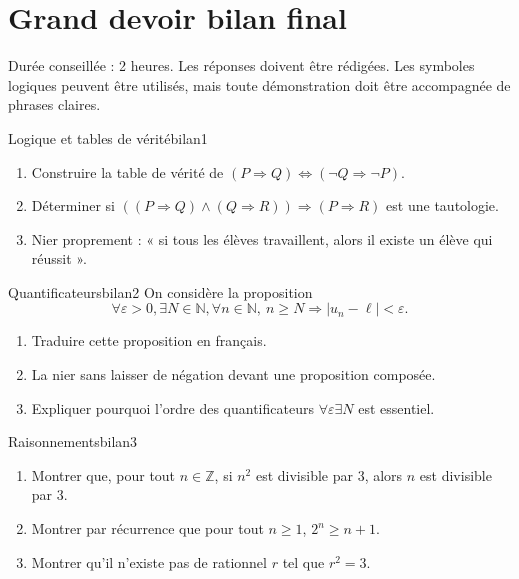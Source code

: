 \documentclass[11pt,a4paper]{article}
\newcommand{\N}{\mathbb{N}}
\newcommand{\Z}{\mathbb{Z}}
\begin{document}
\section{Grand devoir bilan final}

\begin{center}
\begin{tcolorbox}[width=0.95\textwidth,colframe=bleuprepa,colback=blue!3!white,title={Devoir bilan -- Logique, raisonnement, ensembles et applications}]
Durée conseillée : 2 heures. Les réponses doivent être rédigées. Les symboles logiques peuvent être utilisés, mais toute démonstration doit être accompagnée de phrases claires.
\end{tcolorbox}
\end{center}

\begin{exercicebox}{Logique et tables de vérité}{bilan1}
\begin{enumerate}
  \item Construire la table de vérité de $(P\Rightarrow Q)\Longleftrightarrow(\neg Q\Rightarrow\neg P)$.
  \item Déterminer si $((P\Rightarrow Q)\land(Q\Rightarrow R))\Rightarrow(P\Rightarrow R)$ est une tautologie.
  \item Nier proprement : « si tous les élèves travaillent, alors il existe un élève qui réussit ».
\end{enumerate}
\end{exercicebox}

\begin{exercicebox}{Quantificateurs}{bilan2}
On considère la proposition
\[
\forall \varepsilon>0,\exists N\in\N,\forall n\in\N,\ n\geq N\Rightarrow |u_n-\ell|<\varepsilon.
\]
\begin{enumerate}
  \item Traduire cette proposition en français.
  \item La nier sans laisser de négation devant une proposition composée.
  \item Expliquer pourquoi l'ordre des quantificateurs $\forall\varepsilon\exists N$ est essentiel.
\end{enumerate}
\end{exercicebox}

\begin{exercicebox}{Raisonnements}{bilan3}
\begin{enumerate}
  \item Montrer que, pour tout $n\in\Z$, si $n^2$ est divisible par $3$, alors $n$ est divisible par $3$.
  \item Montrer par récurrence que pour tout $n\geq1$, $2^n\geq n+1$.
  \item Montrer qu'il n'existe pas de rationnel $r$ tel que $r^2=3$.
\end{enumerate}
\end{exercicebox}
\end{document}
